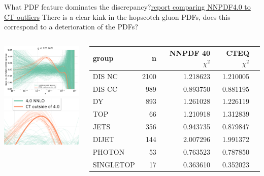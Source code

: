 \documentclass[aspectratio=169,10pt]{beamer}
\begin{document}
\begin{frame}[t]{What PDF feature dominates the discrepancy?}{\href{https://vp.nnpdf.science/OMu9K6ElThiPGrsQKPNt7A==/}{\underline{report} comparing NNPDF4.0 to CT outliers}}
  There is a clear kink in the hopscotch gluon PDFs, does this correspond to a deterioration of the PDFs?
  \begin{columns}
    \begin{column}{.38\textwidth}
      \includegraphics[width=4cm]{plot_pdfreplicas_g.pdf}\\
      \includegraphics[width=4cm]{zoomin.png}
    \end{column}
    \begin{column}{.6\textwidth}
      \begin{tabular}{lr|r|r|r}
        \toprule
        group &  n &  NNPDF 40 $\chi^{2}$ &  CTEQ $\chi^{2}$ \\
        \midrule
        DIS NC &        2100 &    1.218623 &  1.210005 \\
        DIS CC &         989 &    0.893750 &  0.881195 \\
        \color{blue} DY &         893 &   \color{blue} 1.261028 & \color{blue} 1.226119 \\
        \color{red} TOP &          66 &   \color{red}  1.210918 & \color{red}  1.312839 \\
        \color{amethyst} JETS &         356 &     \color{amethyst} 0.943735 &  \color{amethyst} 0.879847 \\
        DIJET &         144 &    2.007296 &  1.991372 \\
        PHOTON &          53 &    0.763523 &  0.787850 \\
        SINGLETOP &          17 &    0.363610 &  0.352023 \\
        \bottomrule
      \end{tabular}
    \end{column}
  \end{columns}
\end{frame}
\end{document}
